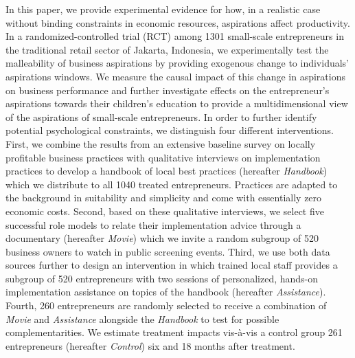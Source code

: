 \documentclass[11.5pt]{article}
\begin{document}
In this paper, we provide experimental evidence for how, in a realistic case without binding constraints in economic resources, aspirations affect productivity. In a randomized-controlled trial (RCT) among 1301 small-scale entrepreneurs in the traditional retail sector of Jakarta, Indonesia, we experimentally test the malleability of business aspirations by providing exogenous change to individuals' aspirations windows. We measure the causal impact of this change in aspirations on business performance and further investigate effects on the entrepreneur's aspirations towards their children's education to provide a multidimensional view of the aspirations of small-scale entrepreneurs. In order to further identify potential psychological constraints, we distinguish four different interventions. First, we combine the results from an extensive baseline survey on locally profitable business practices with qualitative interviews on implementation practices to develop a handbook of local best practices (hereafter \emph{Handbook}) which we distribute to all 1040 treated entrepreneurs. Practices are adapted to the background in suitability and simplicity and come with essentially zero economic costs. Second, based on these qualitative interviews, we select five successful role models to relate their implementation advice through a documentary (hereafter \emph{Movie}) which we invite a random subgroup of 520 business owners to watch in public screening events. Third, we use both data sources further to design an intervention in which trained local staff provides a subgroup of 520 entrepreneurs with two sessions of personalized, hands-on implementation assistance on topics of the handbook (hereafter \emph{Assistance}). Fourth, 260 entrepreneurs are randomly selected to receive a combination of \emph{Movie} and \emph{Assistance} alongside the \emph{Handbook} to test for possible complementarities. We estimate treatment impacts vis-\`{a}-vis a control group 261 entrepreneurs (hereafter \emph{Control}) six and 18 months after treatment.
\end{document}
